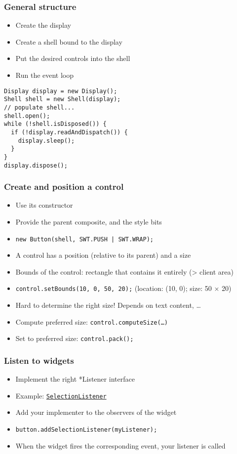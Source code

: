 \documentclass[french, english]{beamer}
\begin{document}
\begin{frame}[fragile]
	\frametitle{General structure}
	\begin{itemize}
		\item Create the display
		\item Create a shell bound to the display
		\item Put the desired controls into the shell
		\item Run the event loop
	\end{itemize}
	\begin{lstlisting}
Display display = new Display();
Shell shell = new Shell(display);
// populate shell...
shell.open();
while (!shell.isDisposed()) {
  if (!display.readAndDispatch()) {
    display.sleep();
  }
}
display.dispose();
	\end{lstlisting}
\end{frame}

\begin{frame}
	\frametitle{Create and position a control}
	\begin{itemize}
		\item Use its constructor
		\item Provide the parent composite, and the style bits
		\item \texttt{new Button(shell, SWT.PUSH | SWT.WRAP);}
		\item A control has a position (relative to its parent) and a size
		\item Bounds of the control: rectangle that contains it entirely (> client area)
		\item \texttt{control.setBounds(10, 0, 50, 20);} (location: (10, 0); size: 50 × 20)
		\item Hard to determine the right size! Depends on text content, …
		\item Compute preferred size: \texttt{control.computeSize(…)}
		\item Set to preferred size: \texttt{control.pack();}
	\end{itemize}
\end{frame}

\begin{frame}
	\frametitle{Listen to widgets}
	\begin{itemize}
		\item Implement the right *Listener interface
		\item Example: \href{http://help.eclipse.org/oxygen/advanced/content.jsp?topic=/org.eclipse.platform.doc.isv/reference/api/org/eclipse/swt/events/SelectionListener.html}{\texttt{SelectionListener}}
		\item Add your implementer to the observers of the widget
		\item \texttt{button.addSelectionListener(myListener);}
		\item When the widget fires the corresponding event, your listener is called
	\end{itemize}
\end{frame}
\end{document}
